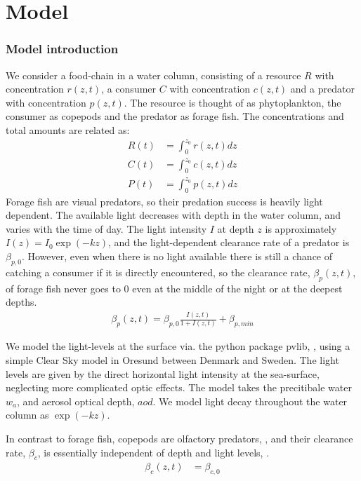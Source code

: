 
\section{Model}

\subsubsection*{Model introduction}
We consider a food-chain in a water column, consisting of a resource $R$ with concentration $r(z,t)$, a consumer $C$ with concentration $c(z,t)$ and a predator with concentration $p(z,t)$. The resource is thought of as phytoplankton, the consumer as copepods and the predator as forage fish. The concentrations and total amounts are related as:
\begin{align}
        R(t) &= \int_0^{z_0} r(z,t) dz \\
	      C(t) &= \int_0^{z_0} c(z,t) dz \\
	      P(t) &= \int_0^{z_0} p(z,t) dz
\end{align}
Forage fish are visual predators, so their predation success is heavily light dependent. The available light decreases with depth in the water column, and varies with the time of day.
The light intensity $I$ at depth $z$ is approximately $I(z) = I_0\exp(-kz)$, and the light-dependent clearance rate of a predator is $\beta_{p,0}$.  However, even when there is no light available there is still a chance of catching a consumer if it is directly encountered,  so the clearance rate, $\beta_p(z,t)$, of forage fish never goes to 0 even at the middle of the night or at the deepest depths.
\begin{align}
  \beta_p(z,t) = \beta_{p,0} \frac{I(z,t)}{1+I(z,t)} + \beta_{p,min}
\end{align}


We model the light-levels at the surface via. the python package pvlib, \citep{}, using a simple Clear Sky model in Oresund between Denmark and Sweden. The light levels are given by the direct horizontal light intensity at the sea-surface, neglecting more complicated optic effects. The model takes the precitibale water $w_a$, and aerosol optical depth, $aod$. We model light decay throughout the water column as $\exp(-kz)$.


In contrast to forage fish, copepods are olfactory predators, \citep{}, and their clearance rate, $\beta_c$, is essentially independent of depth and light levels, \citep{}.
\begin{align}
	\beta_c(z,t) &=  \beta_{c,0}
\end{align}

